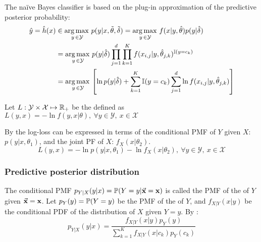 The naïve Bayes classifier is based on the plug-in approximation of the predictive posterior probability:
\begin{align*}
    \hat{y}=\hat{h}(x) &\in   \operatorname*{arg\,max\,}_{y\,\in\mathcal{Y}}p(y|x,\Tilde{\theta},\Tilde{\delta})  = \operatorname*{arg\,max\,}_{y\,\in\mathcal{Y}} f(x|y,\hat{\theta})p(y|\hat{\delta})\\
    &= \operatorname*{arg\,max\,}_{y\,\in\mathcal{Y}}p(y|\hat{\delta})\prod_{j=1}^d\prod_{k=1}^K  f(x_{i,j}|y,\hat{\theta}_{j,k})^{\operatorname{\mathbb{I}}(y=c_k)}\\
    &= \operatorname*{arg\,max\,}_{y\,\in\mathcal{Y}}\left[ \ln p(y|\hat{\delta})+\sum_{k=1}^K\operatorname{\mathbb{I}}(y=c_k)\sum_{j=1}^d  \ln f(x_{i,j}|y,\hat{\theta}_{j,k})\right]
\end{align*}




\clearpage
Let $L:\mathcal{Y}\times\mathcal{X}\mapsto\operatorname{\mathbb{R}}_+$ be the  defined as $L(y,x) = -\ln f(y,x|\theta),\ \forall y\in\mathcal{Y},\ x\in\mathcal{X}$









By  the log-loss can be expressed in terms of the conditional PMF of $Y$ given $X$: $p(y|x,\theta_1)$, and the joint PF of $X$: $f_X(x|\theta_2)$.
\begin{equation*}
    L(y,x) = -\ln p(y|x,\theta_1)-\ln f_X(x|\theta_2),\ \forall y\in\mathcal{Y},\ x\in\mathcal{X}
\end{equation*}











\subsubsection{Predictive posterior distribution}

The conditional PMF $p_{Y|X}(y|x)=\operatorname{\mathbb{P}}(Y=y|\va{x}=\vb{x})$ is called the PMF of the  of $Y$ given $\va{x}=\vb{x}$. Let $p_Y(y)=\operatorname{\mathbb{P}}(Y=y)$ be the PMF of the  of $Y$, and $f_{X|Y}(x|y)$ be the conditional PDF of the distribution of $X$ given $Y=y$. By :
\begin{equation*}
    p_{Y|X}(y|x)= \frac{f_{X|Y}(x|y)p_Y(y)}{\sum_{k=1}^Kf_{X|Y}(x|c_k)p_Y(c_k)}
\end{equation*}

